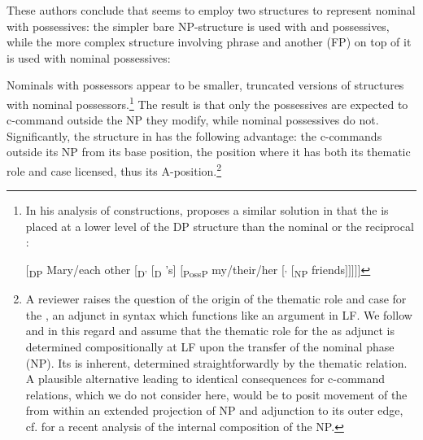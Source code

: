 \documentclass[output=paper,nonflat,colorlinks,citecolor=brown,newtxmath]{langsci/langscibook}
\begin{document}
\largerpage
\noindent These authors conclude that  seems to employ two structures to represent nominal with possessives: the simpler bare NP-structure is used with  and  possessives, while the more complex structure involving  phrase and another  (FP) on top of it is used with nominal possessives:

\ea \label{ex:witkos:20}
	\z
\z

\noindent Nominals with  possessors appear to be smaller, truncated versions of structures with nominal possessors.\footnote{\label{fn16}In his analysis of   constructions, \cite{despic2015} proposes a similar solution in that the   is placed at a lower level of the DP structure than the nominal  or the reciprocal :

\ea
$[$\textsubscript{DP} Mary/each other [\textsubscript{D$’$} [\textsubscript{D} 's] [\textsubscript{PossP} my/their/her [\textsubscript{$’$}  [\textsubscript{NP} friends$]]]]]$
\z} The result is that only the  possessives are expected to c-command outside the NP they modify, while nominal possessives do not. Significantly, the structure in  has the following advantage: the  c-commands outside its NP from its base position, the position where it has both its thematic role and case licensed, thus its A-position.\footnote{\label{fn17}A reviewer raises the question of the origin of the thematic role and case for the , an adjunct in syntax which functions like an argument in LF. We follow \cite{boskovic2005locality,boskovic2012} and \cite{despic2011,despic2013,despic2015} in this regard and assume that the thematic role for the  as adjunct is determined compositionally at LF upon the transfer of the nominal phase (NP). Its  is inherent, determined straightforwardly by the thematic relation. A plausible alternative leading to identical consequences for c-command relations, which we do not consider here, would be to posit movement of the   from within an extended projection of NP and adjunction to its outer edge, cf. \cite{ceglowski2017} for a recent analysis of the internal composition of the  NP.}
\end{document}

